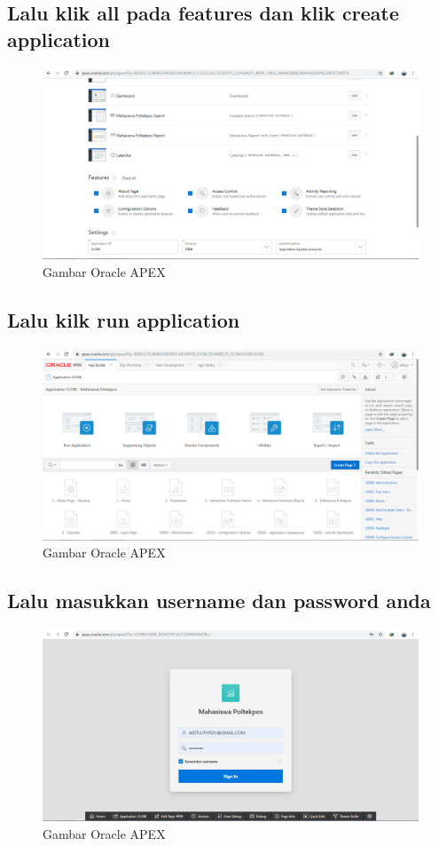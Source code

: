 \documentclass[12pt, times new roman, a4paper]{article}
\begin{document}
\subsection{Lalu klik all pada features dan klik create application}
\begin{figure}[h]
	\centering
		\includegraphics[scale=0.3]{gambar/9}
	\caption{Gambar Oracle APEX}
\end{figure}

\subsection{Lalu kilk run application}
\begin{figure}[h]
	\centering
		\includegraphics[scale=0.4]{gambar/10}
	\caption{Gambar Oracle APEX}
\end{figure}

\subsection{Lalu masukkan username dan password anda}
\begin{figure}[h]
	\centering
		\includegraphics[scale=0.3]{gambar/11}
	\caption{Gambar Oracle APEX}
\end{figure}
\end{document}

